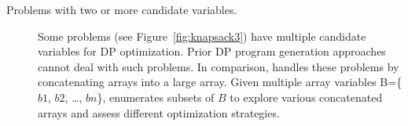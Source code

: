 \begin{description}
		\item[Problems with two or more candidate variables.] 
		Some problems (see Figure~\ref{fig:knapsack3}) have multiple candidate variables for DP optimization. 
		Prior DP program generation approaches~\cite{Moor1994Categories,Sauthoff2011Bellman,Morihata2014Dynamic} cannot deal with such problems. In comparison, \tool handles these problems by concatenating arrays into a large array. Given multiple array variables B=\{$b1$, $b2$, \ldots, $bn$\}, \tool enumerates subsets of $B$ to explore various concatenated arrays and assess different optimization strategies. 
	\end{description}

